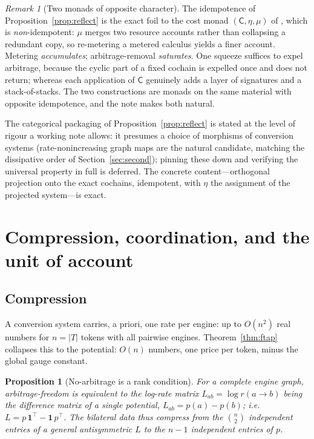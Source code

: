 \documentclass[11pt]{article}
\theoremstyle{definition}
\theoremstyle{plain}
\newtheorem{proposition}[definition]{Proposition}
\theoremstyle{remark}
\newtheorem{remark}[definition]{Remark}
\newcommand{\Tok}{T}
\newcommand{\cost}{\mathsf{C}}
\begin{document}
\begin{remark}[Two monads of opposite character]
The idempotence of Proposition~\ref{prop:reflect} is the exact foil to the cost monad
$(\cost,\eta,\mu)$ of \cite[\S9]{CE}, which is \emph{non}-idempotent: $\mu$ merges two resource
accounts rather than collapsing a redundant copy, so re-metering a metered calculus yields a finer
account. Metering \emph{accumulates}; arbitrage-removal \emph{saturates}. One squeeze suffices to
expel arbitrage, because the cyclic part of a fixed cochain is expelled once and does not return;
whereas each application of $\cost$ genuinely adds a layer of signatures and a stack-of-stacks.
The two constructions are monads on the same material with opposite idempotence, and the note
\cite{CE} makes both natural.
\end{remark}

The categorical packaging of Proposition~\ref{prop:reflect} is stated at the level of rigour a
working note allows: it presumes a choice of morphisms of conversion systems (rate-nonincreasing
graph maps are the natural candidate, matching the dissipative order of
Section~\ref{sec:second}); pinning these down and verifying the universal property in full is
deferred. The concrete content---orthogonal projection onto the exact cochains, idempotent, with
$\eta$ the assignment of the projected system---is exact.

\section{Compression, coordination, and the unit of account}
\label{sec:compress}

\subsection*{Compression}
A conversion system carries, a priori, one rate per engine: up to $O(n^2)$ real numbers for
$n=|\Tok|$ tokens with all pairwise engines. Theorem~\ref{thm:ftap} collapses this to the
potential: $O(n)$ numbers, one price per token, minus the global gauge constant.

\begin{proposition}[No-arbitrage is a rank condition]
For a complete engine graph, arbitrage-freedom is equivalent to the log-rate matrix
$L_{ab}=\log r(a\!\to\! b)$ being the \emph{difference matrix of a single potential},
$L_{ab}=p(a)-p(b)$; i.e.\ $L=p\,\mathbf{1}^{\!\top}-\mathbf{1}\,p^{\!\top}$. The bilateral data thus
compress from the $\binom{n}{2}$ independent entries of a general antisymmetric $L$ to the $n-1$
independent entries of $p$.
\end{proposition}
\end{document}
